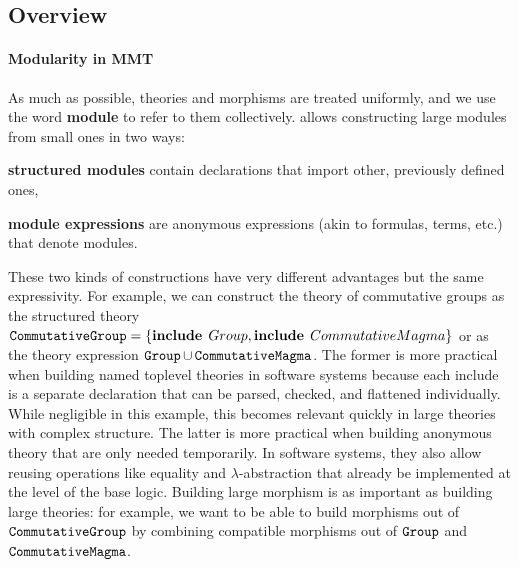 
\subsection{Overview}

\begin{modexp}
\paragraph{Modularity in MMT}
As much as possible, theories and morphisms are treated uniformly, and we use the word \textbf{module} to refer to them collectively.
\mmt allows constructing large modules from small ones in two ways:
\begin{compactitem}
  \item \textbf{structured modules} contain declarations that import other, previously defined ones,
  \item \textbf{module expressions} are anonymous expressions (akin to formulas, terms, etc.) that denote modules.
\end{compactitem}

These two kinds of constructions have very different advantages but the same expressivity.
For example, we can construct the theory of commutative groups as the structured theory $\operatorname{\mathtt{CommutativeGroup}}=\{\operatorname{\mathbf{include}}{\;Group},\operatorname{\mathbf{include}}{\;CommutativeMagma}\}$ or as the theory expression $\operatorname{\mathtt{Group}}\cup\operatorname{\mathtt{CommutativeMagma}}$.
The former is more practical when building named toplevel theories in software systems because each include is a separate declaration that can be parsed, checked, and flattened individually.
While negligible in this example, this becomes relevant quickly in large theories with complex structure.
The latter is more practical when building anonymous theory that are only needed temporarily.
In software systems, they also allow reusing operations like equality and $\lambda$-abstraction that already be implemented at the level of the base logic.
Building large morphism is as important as building large theories: for example, we want to be able to build morphisms out of $\operatorname{\mathtt{CommutativeGroup}}$ by combining compatible morphisms out of $\operatorname{\mathtt{Group}}$ and $\operatorname{\mathtt{CommutativeMagma}}$.
\end{modexp}

